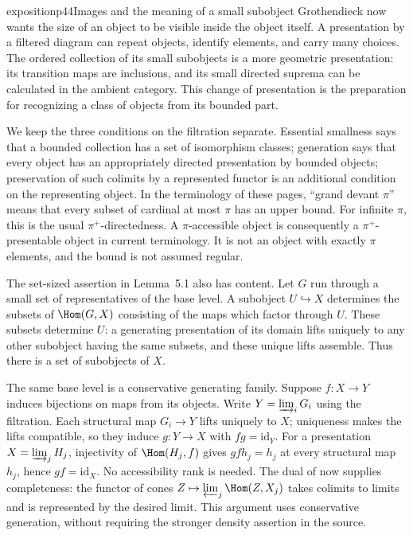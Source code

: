 \begin{dcomment}{exposition}{p44}{Images and the meaning of a small subobject}
Grothendieck now wants the size of an object to be visible inside the object itself. A presentation by a filtered diagram can repeat objects, identify elements, and carry many choices. The ordered collection of its small subobjects is a more geometric presentation: its transition maps are inclusions, and its small directed suprema can be calculated in the ambient category. This change of presentation is the preparation for recognizing a class of objects from its bounded part.

We keep the three conditions on the filtration separate. Essential smallness says that a bounded collection has a set of isomorphism classes; generation says that every object has an appropriately directed presentation by bounded objects; preservation of such colimits by a represented functor is an additional condition on the representing object. In the terminology of these pages, ``grand devant $\pi$'' means that every subset of cardinal at most $\pi$ has an upper bound. For infinite $\pi$, this is the usual $\pi^+$-directedness. A $\pi$-accessible object is consequently a $\pi^+$-presentable object in current terminology. It is not an object with exactly $\pi$ elements, and the bound is not assumed regular.

The set-sized assertion in Lemma~5.1 also has content. Let $G$ run through a small set of representatives of the base level. A subobject $U\hookrightarrow X$ determines the subsets of $\Hom(G,X)$ consisting of the maps which factor through $U$. These subsets determine $U$: a generating presentation of its domain lifts uniquely to any other subobject having the same subsets, and these unique lifts assemble. Thus there is a set of subobjects of $X$.

The same base level is a conservative generating family. Suppose $f:X\to Y$ induces bijections on maps from its objects. Write $Y=\varinjlim_iG_i$ using the filtration. Each structural map $G_i\to Y$ lifts uniquely to $X$; uniqueness makes the lifts compatible, so they induce $g:Y\to X$ with $fg=\mathrm{id}_Y$. For a presentation $X=\varinjlim_jH_j$, injectivity of $\Hom(H_j,f)$ gives $gf h_j=h_j$ at every structural map $h_j$, hence $gf=\mathrm{id}_X$. No accessibility rank is needed. The dual of \citep[Expos\'e~I, 8.12.7]{SGA4I1972} now supplies completeness: the functor of cones $Z\mapsto\varprojlim_j\Hom(Z,X_j)$ takes colimits to limits and is represented by the desired limit. This argument uses conservative generation, without requiring the stronger density assertion in the source.


\end{dcomment}
